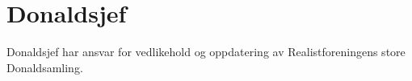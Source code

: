 \section{Donaldsjef}
Donaldsjef har ansvar for vedlikehold og oppdatering av Realistforeningens store Donaldsamling.
